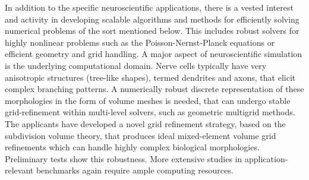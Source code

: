%
In addition to the specific neuroscientific applications, there is a vested interest and activity in developing scalable algorithms and methods for efficiently solving numerical problems of the sort mentioned below. This includes robust solvers for highly nonlinear problems such as the Poisson-Nernst-Planck equations or efficient geometry and grid handling. A major aspect of neuroscientific simulation is the underlying computational domain. Nerve cells typically have very anisotropic structures (tree-like shapes), termed dendrites and axons, that elicit complex branching patterns. A numerically robust discrete representation of these morphologies in the form of volume meshes is needed, that can undergo stable grid-refinement within multi-level solvers, such as geometric multigrid methods. The applicants have developed a novel grid refinement strategy, based on the subdivision volume theory, that produces ideal mixed-element volume grid refinements which can handle highly complex biological morphologies. Preliminary tests show this robustness. More extensive studies in application-relevant benchmarks again require ample computing resources.
